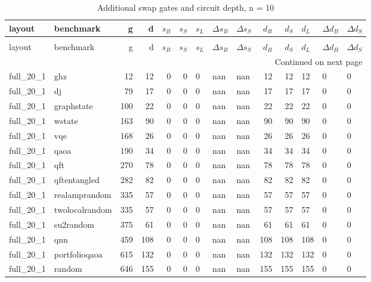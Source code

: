 \thispagestyle{empty}
\begin{longtable}{llrrrrlllrrlll}
\caption{Additional swap gates and circuit depth, n = 10} \label{benchmark-table-10} \\
\toprule
layout & benchmark & g & d & $s_B$ & $s_S$ & $s_L$ & $\Delta s_B$ & $\Delta s_S$ & $d_B$ & $d_S$ & $d_L$ & $\Delta d_B$ & $\Delta d_S$ \\
\midrule
\endfirsthead
\caption[]{Additional swap gates and circuit depth, n = 10} \\
\toprule
layout & benchmark & g & d & $s_B$ & $s_S$ & $s_L$ & $\Delta s_B$ & $\Delta s_S$ & $d_B$ & $d_S$ & $d_L$ & $\Delta d_B$ & $\Delta d_S$ \\
\midrule
\endhead
\midrule
\multicolumn{14}{r}{Continued on next page} \\
\midrule
\endfoot
\bottomrule
\endlastfoot
full\_20\_1 & ghz & 12 & 12 & 0 & 0 & 0 & nan & nan & 12 & 12 & 12 & 0 & 0 \\
full\_20\_1 & dj & 79 & 17 & 0 & 0 & 0 & nan & nan & 17 & 17 & 17 & 0 & 0 \\
full\_20\_1 & graphstate & 100 & 22 & 0 & 0 & 0 & nan & nan & 22 & 22 & 22 & 0 & 0 \\
full\_20\_1 & wstate & 163 & 90 & 0 & 0 & 0 & nan & nan & 90 & 90 & 90 & 0 & 0 \\
full\_20\_1 & vqe & 168 & 26 & 0 & 0 & 0 & nan & nan & 26 & 26 & 26 & 0 & 0 \\
full\_20\_1 & qaoa & 190 & 34 & 0 & 0 & 0 & nan & nan & 34 & 34 & 34 & 0 & 0 \\
full\_20\_1 & qft & 270 & 78 & 0 & 0 & 0 & nan & nan & 78 & 78 & 78 & 0 & 0 \\
full\_20\_1 & qftentangled & 282 & 82 & 0 & 0 & 0 & nan & nan & 82 & 82 & 82 & 0 & 0 \\
full\_20\_1 & realamprandom & 335 & 57 & 0 & 0 & 0 & nan & nan & 57 & 57 & 57 & 0 & 0 \\
full\_20\_1 & twolocalrandom & 335 & 57 & 0 & 0 & 0 & nan & nan & 57 & 57 & 57 & 0 & 0 \\
full\_20\_1 & su2random & 375 & 61 & 0 & 0 & 0 & nan & nan & 61 & 61 & 61 & 0 & 0 \\
full\_20\_1 & qnn & 459 & 108 & 0 & 0 & 0 & nan & nan & 108 & 108 & 108 & 0 & 0 \\
full\_20\_1 & portfolioqaoa & 615 & 132 & 0 & 0 & 0 & nan & nan & 132 & 132 & 132 & 0 & 0 \\
full\_20\_1 & random & 646 & 155 & 0 & 0 & 0 & nan & nan & 155 & 155 & 155 & 0 & 0 \\

\end{longtable}

